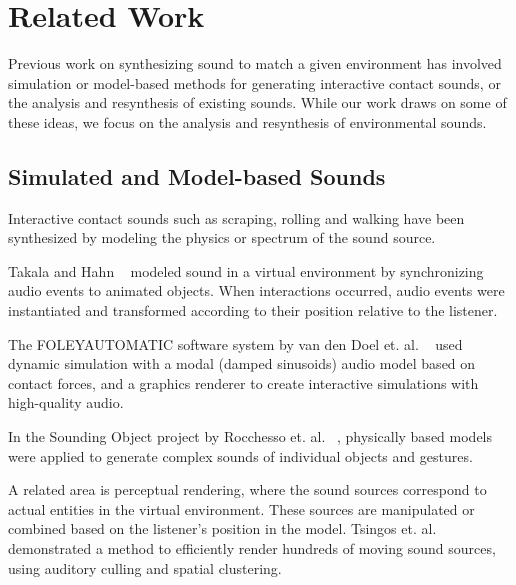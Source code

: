 \documentclass{acmsiggraph}               %
\begin{document}
\section{Related Work}

Previous work on synthesizing sound to match a given environment has 
involved simulation or model-based methods for generating interactive 
contact sounds, or the analysis and resynthesis of existing sounds. 
While our work draws on some of these ideas, we focus on the 
analysis and resynthesis of environmental sounds.

         
\subsection{Simulated and Model-based Sounds}

Interactive contact sounds such as scraping, rolling and walking have 
been synthesized by modeling the physics or spectrum of the sound 
source.  ~\cite{CookBook}

Takala and Hahn ~ modeled sound in a virtual 
environment by synchronizing audio events to animated objects. When 
interactions occurred, audio events were instantiated and transformed 
according to their position relative to the listener. 

The FOLEYAUTOMATIC software system by van den Doel et. al. 
~ used dynamic simulation with a modal (damped 
sinusoids) audio model based on contact forces, and a graphics renderer 
to create interactive simulations with high-quality audio. 

In the Sounding Object project by Rocchesso et. al. 
~, physically based models were applied to 
generate complex sounds of individual objects and gestures. 


A related area is perceptual rendering, where the sound sources 
correspond to actual entities in the virtual environment. These sources are 
manipulated or combined based on the listener's position in the model. 
Tsingos et. al. ~ demonstrated a method to 
efficiently render hundreds of moving sound sources, using 
auditory culling and spatial clustering. 
\end{document}
